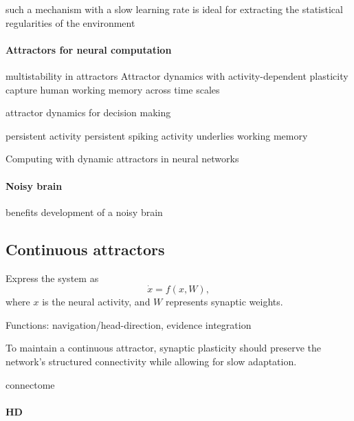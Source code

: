 \documentclass{article}
\theoremstyle{definition} \newtheorem{definition}{Definition}
\theoremstyle{remark} \newtheorem{remark}{Remark}
\newcounter{ct}
\begin{document}
such a mechanism with a slow learning rate is ideal for extracting the statistical regularities of the environment \citep{panichello2019error}

\paragraph{Attractors for neural computation}
multistability in attractors \citep{braun2010attractors}
Attractor dynamics with activity-dependent plasticity capture human working memory across time scales \citep{brennan2023attractor}

attractor dynamics for decision making \citep{luo2023noncanonical}

persistent activity \citep{curtis2010beyond} \citep{bray2017persistence}
\citep{constantinidis2018persistent} persistent spiking activity underlies working memory

Computing with dynamic attractors in neural networks \citep{hirsch1995computing}

\paragraph{Noisy brain}
\citep{cheung2010noisybrain}
\citep{rolls2010noisybrain}
benefits\citep{mcdonnell2011benefits}
development of a noisy brain \citep{mcintosh2010development}


\subsection{Continuous attractors}
Express the system as 
\begin{equation}
\dot x = f(x,W),
\end{equation} where $x$ is the neural activity, and $W$ represents synaptic weights.

Functions: navigation/head-direction\citep{wilson2023navigation, skaggs1994model}, evidence integration\citep{mante2013context, esnaola2022flexible}

To maintain a continuous attractor, synaptic plasticity should preserve the network’s structured connectivity while allowing for slow adaptation.
\citep{cannon1983oculomotor}
\citep{samsonovich1997pathintegration}

connectome \citep{kakaria2017ra}

\paragraph{HD}
\citep{skaggs1994model, redish1996coupled, boucheny2005continuous}
\citep{stentiford2022spiking}
\citep{barak2021mapping}
\end{document}
